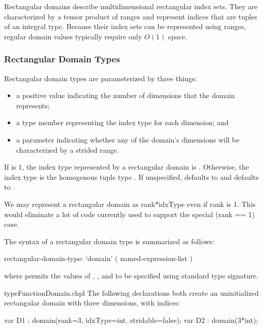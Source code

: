 Rectangular domains describe multidimensional rectangular index sets.  They are
characterized by a tensor product of ranges and represent indices that are
tuples of an integral type.  Because their index sets can be represented using
ranges, regular domain values typically require only $O(1)$ space.

\subsubsection{Rectangular Domain Types}

Rectangular domain types are parameterized by three things:
\begin{itemize}
\item {} a positive  value indicating the number
of dimensions that the domain represents;
\item {} a type member representing the index type for
each dimension; and
\item {} a  parameter indicating whether
any of the domain's dimensions will be characterized by a strided
range.
\end{itemize}
If  is $1$, the index type represented by a rectangular
domain is .  Otherwise, the index type is the homogenous
tuple type .
If unspecified,  defaults
to  and  defaults to .

\begin{openissue}
We may represent a rectangular domain as rank*idxType even if rank is 1.  This
would eliminate a lot of code currently used to support the special (rank == 1) case.
\end{openissue}

The syntax of a rectangular domain type is summarized as follows:
\begin{syntax}
rectangular-domain-type:
  `domain' ( named-expression-list )
\end{syntax}

\noindent where  permits the values of
, , and  to be specified
using standard type signature.

\begin{chapelexample}{typeFunctionDomain.chpl}
The following declarations both create an uninitialized rectangular domain with three dimensions, with  indices:
\begin{chapel}
var D1 : domain(rank=3, idxType=int, stridable=false);
var D2 : domain(3*int);
\end{chapel}
\begin{chapeloutput}
\end{chapeloutput}
\end{chapelexample}

